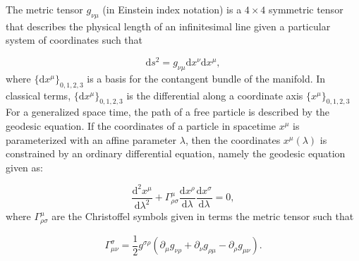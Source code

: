The metric tensor $g_{\nu \mu}$ (in Einstein index notation) is a $4 \times 4$ symmetric tensor that describes the physical length of an infinitesimal line given a particular system of coordinates such that 

\begin{equation}
\mathrm{d}s^2 = g_{\nu \mu} \mathrm{d}x^{\nu} \mathrm{d}x^{\mu},
\end{equation}
where $\{\mathrm{d}x^\mu\}_{0, 1, 2, 3}$ is a basis for the contangent bundle of the manifold. In classical terms, $\{\mathrm{d}x^\mu\}_{0, 1, 2, 3}$ is the differential along a coordinate axis $\{x^\mu\}_{0, 1, 2, 3}$ For a generalized space time, the path of a free particle is described by the geodesic equation. If the coordinates of a particle in spacetime $x^\mu$ is parameterized with an affine parameter $\lambda$, then the coordinates $x^{\mu} (\lambda)$ is constrained by an ordinary differential equation, namely the geodesic equation given as:

\begin{equation} \label{eq:geodesic}
    \frac{\mathrm{d}^2x^\mu}{\mathrm{d}\lambda^2} + \Gamma^\mu_{\rho\sigma} \frac{\mathrm{d}x^\rho}{\mathrm{d}\lambda} \frac{\mathrm{d}x^\sigma}{\mathrm{d}\lambda} = 0,
\end{equation}
where $\Gamma^\mu_{\rho\sigma}$ are the Christoffel symbols given in terms the metric tensor such that

\begin{equation}
    \Gamma^\sigma_{\mu\nu} = \frac{1}{2} g^{\sigma\rho} \left( \partial_\mu g_{\nu\rho} + \partial_\nu g_{\rho\mu} - \partial_\rho g_{\mu\nu} \right)  .  
\end{equation}

